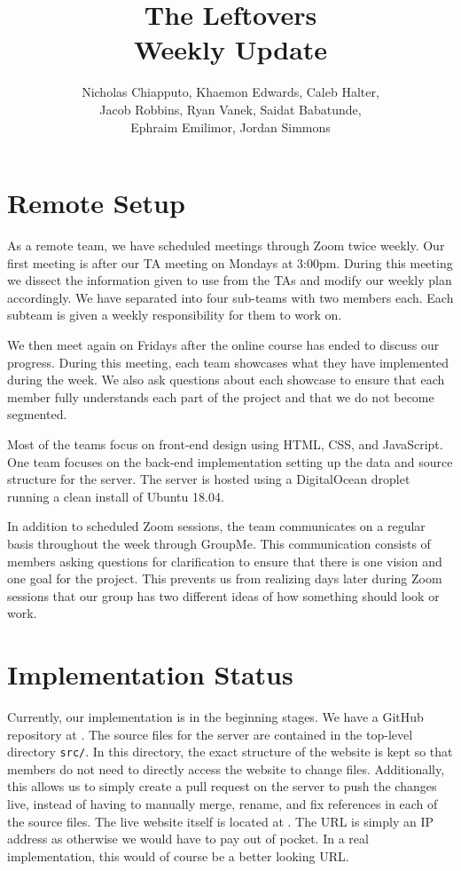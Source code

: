 \documentclass[12pt]{article}
\begin{document}
	\title{ The Leftovers \\
			\Large{Weekly Update} }

	\author{	Nicholas Chiapputo, Khaemon Edwards, Caleb Halter, \\
				Jacob Robbins, Ryan Vanek, Saidat Babatunde, \\
				Ephraim Emilimor, Jordan Simmons
	}

	\maketitle

	\section{Remote Setup}
		As a remote team, we have scheduled meetings through Zoom twice weekly. Our first meeting is after our TA meeting on Mondays at 3:00pm. During this meeting we dissect the information given to use from the TAs and modify our weekly plan accordingly. We have separated into four sub-teams with two members each. Each subteam is given a weekly responsibility for them to work on.

		We then meet again on Fridays after the online course has ended to discuss our progress. During this meeting, each team showcases what they have implemented during the week. We also ask questions about each showcase to ensure that each member fully understands each part of the project and that we do not become segmented. 

		Most of the teams focus on front-end design using HTML, CSS, and JavaScript. One team focuses on the back-end implementation setting up the data and source structure for the server. The server is hosted using a DigitalOcean droplet running a clean install of Ubuntu 18.04. 

		In addition to scheduled Zoom sessions, the team communicates on a regular basis throughout the week through GroupMe. This communication consists of members asking questions for clarification to ensure that there is one vision and one goal for the project. This prevents us from realizing days later during Zoom sessions that our group has two different ideas of how something should look or work.

	\section{Implementation Status}
		Currently, our implementation is in the beginning stages. We have a GitHub repository at \cite{github}. The source files for the server are contained in the top-level directory \texttt{src/}. In this directory, the exact structure of the website is kept so that members do not need to directly access the website to change files. Additionally, this allows us to simply create a pull request on the server to push the changes live, instead of having to manually merge, rename, and fix references in each of the source files. The live website itself is located at \cite{website}. The URL is simply an IP address as otherwise we would have to pay out of pocket. In a real implementation, this would of course be a better looking URL.
\end{document}

